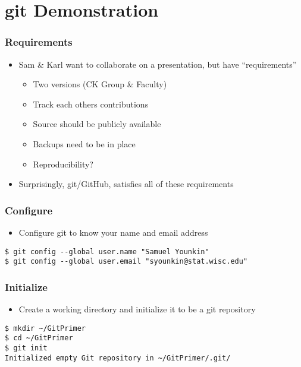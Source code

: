 \documentclass[handout,13pt,compress,c]{beamer}
\newcommand{\bi}{\begin{itemize}}
\newcommand{\ei}{\end{itemize}}
\begin{document}
\section{git Demonstration}
\begin{frame}[fragile]
\frametitle{Requirements}
\bi
\item Sam \& Karl want to collaborate on a presentation, but have ``requirements''
\bi
\item Two versions (CK Group \& Faculty)
\item Track each others contributions
\item Source should be publicly available
\item Backups need to be in place
\item Reproducibility?
\ei
\item Surprisingly, git/GitHub, satisfies all of these requirements
\ei
\end{frame}
\begin{frame}[fragile]
\frametitle{Configure}
\bi
\item Configure git to know your name and email address
\ei
\begin{semiverbatim}
\begin{lstlisting}
$ git config --global user.name "Samuel Younkin"
$ git config --global user.email "syounkin@stat.wisc.edu"
\end{lstlisting}
\end{semiverbatim}
\end{frame}
\begin{frame}[fragile]
\frametitle{Initialize}
\bi
\item Create a working directory and initialize it to be a git
  repository
\ei
\begin{semiverbatim}
\begin{lstlisting}
$ mkdir ~/GitPrimer
$ cd ~/GitPrimer
$ git init
Initialized empty Git repository in ~/GitPrimer/.git/
\end{lstlisting}
\end{semiverbatim}
\end{frame}
\end{document}
